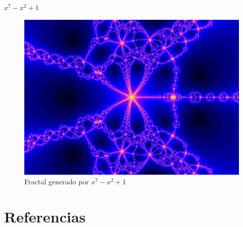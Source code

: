 $x^7-x^2+1$
\begin{figure}[H]
    \centering
    \includegraphics[scale=0.26]{images/ej5.png}
    \caption{Fractal generado por $x^7-x^2+1$}
    \label{fig:ej_5}
\end{figure}

\section{Referencias}

